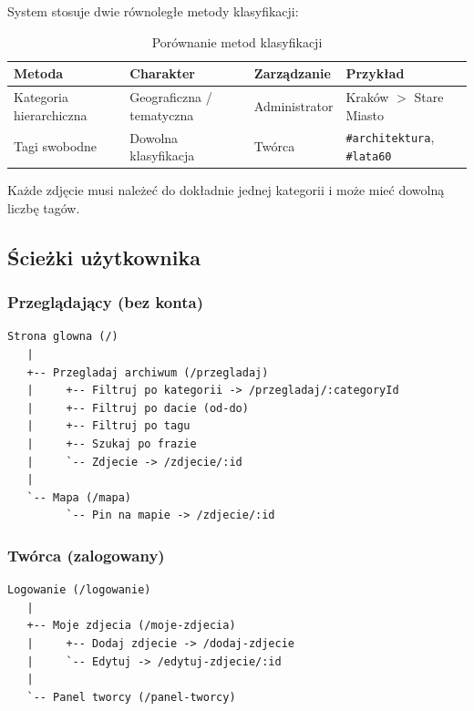 \documentclass[12pt, a4paper]{article}
\begin{document}
System stosuje dwie równoległe metody klasyfikacji:

\begin{table}[H]
  \centering
  \caption{Porównanie metod klasyfikacji}
  \begin{tabular}{@{}L{3.5cm}L{3.5cm}L{3cm}L{4cm}@{}}
    \toprule
    \textbf{Metoda} & \textbf{Charakter} & \textbf{Zarządzanie} & \textbf{Przykład} \\
    \midrule
    Kategoria hierarchiczna & Geograficzna / tematyczna & Administrator & Kraków $>$ Stare Miasto \\
    \addlinespace
    Tagi swobodne & Dowolna klasyfikacja & Twórca & \texttt{\#architektura}, \texttt{\#lata60} \\
    \bottomrule
  \end{tabular}
\end{table}

Każde zdjęcie musi należeć do dokładnie jednej kategorii i może mieć dowolną liczbę tagów.

\subsection{Ścieżki użytkownika}

\subsubsection{Przeglądający (bez konta)}

\begin{lstlisting}[style=plain]
Strona glowna (/)
   |
   +-- Przegladaj archiwum (/przegladaj)
   |     +-- Filtruj po kategorii -> /przegladaj/:categoryId
   |     +-- Filtruj po dacie (od-do)
   |     +-- Filtruj po tagu
   |     +-- Szukaj po frazie
   |     `-- Zdjecie -> /zdjecie/:id
   |
   `-- Mapa (/mapa)
         `-- Pin na mapie -> /zdjecie/:id
\end{lstlisting}

\subsubsection{Twórca (zalogowany)}

\begin{lstlisting}[style=plain]
Logowanie (/logowanie)
   |
   +-- Moje zdjecia (/moje-zdjecia)
   |     +-- Dodaj zdjecie -> /dodaj-zdjecie
   |     `-- Edytuj -> /edytuj-zdjecie/:id
   |
   `-- Panel tworcy (/panel-tworcy)
\end{lstlisting}
\end{document}
